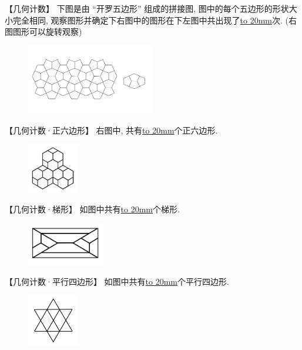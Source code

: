 \item {
    【几何计数】
    下图是由 ``开罗五边形'' 组成的拼接图, 图中的每个五边形的形状大小完全相同, 观察图形并确定下右图中的图形在下左图中共出现了\underline{\hbox to 20mm{}}次. (右图图形可以旋转观察)
    \begin{figure}[H] 
        \centering
        \includegraphics[width=0.5\textwidth]{./pics/Chapter_4/8.png}
    \end{figure}
}

\item {
    【几何计数·正六边形】
    右图中, 共有\underline{\hbox to 20mm{}}个正六边形.
    \begin{figure}[H] 
        \centering
        \includegraphics[width=0.2\textwidth]{./pics/Chapter_4/14.png}
    \end{figure}
}

\item {
    【几何计数·梯形】
    如图中共有\underline{\hbox to 20mm{}}个梯形.
    \begin{figure}[H] 
        \centering
        \includegraphics[width=0.3\textwidth]{./pics/Chapter_4/2016_1.png}
    \end{figure}
}

\item {
    【几何计数·平行四边形】
    如图中共有\underline{\hbox to 20mm{}}个平行四边形.
    \begin{figure}[H] 
        \centering
        \includegraphics[width=0.2\textwidth]{./pics/Chapter_4/2017_1.png}
    \end{figure}
}

